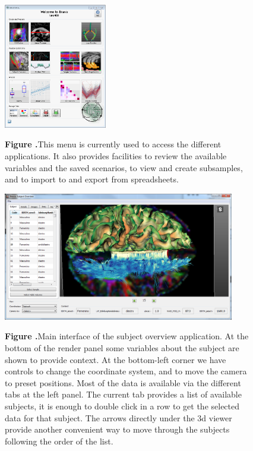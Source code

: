 \documentclass[utf8]{frontiersSCNS} %
\begin{document}
\begin{figure}[h!]
\begin{center}
\includegraphics[width=0.4\textwidth]{figures/braviz_menu.PNG}
\end{center}
 \textbf{\label{fig_menu} Figure .}{This menu is currently used to access the different applications. It also provides facilities to review the available variables and the saved scenarios, to view and create subsamples, and to import to and export from spreadsheets.  }
\end{figure}

\begin{figure}[h!]
\begin{center}
\includegraphics[width=0.9\textwidth]{figures/subj_overview_full.PNG}
\end{center}
 \textbf{\label{fig_subject} Figure .}{Main interface of the subject overview application. At the bottom of the render panel some variables about the subject are shown to provide context. At the bottom-left corner we have controls to change the coordinate system, and to move the camera to preset positions. Most of the data is available via the different tabs at the left panel. The current tab provides a list of available subjects, it is enough to double click in a row to get the selected data for that subject. The arrows directly under the 3d viewer provide another convenient way to move through the subjects following the order of the list. }
\end{figure}
\end{document}
